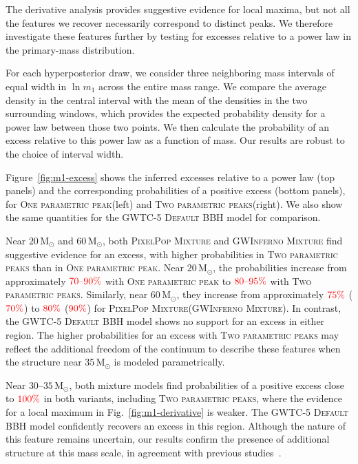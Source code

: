 \documentclass[twocolumn,twocolappendix,linenumbers]{aastex631}
\newcommand{\PPMixture}{\textsc{PixelPop Mixture}\xspace}
\newcommand{\GwinfMixture}{\textsc{GWInferno Mixture}\xspace}
\newcommand{\oneparpeak}{\textsc{One parametric peak}\xspace}
\newcommand{\twoparpeaks}{\textsc{Two parametric peaks}\xspace}
\newcommand{\Msun}{\ensuremath{\mathrm{M}_\odot}\xspace}
\begin{document}
The derivative analysis provides suggestive evidence for local maxima, but not all the features we recover necessarily correspond to distinct peaks.
We therefore investigate these features further by testing for excesses relative to a power law in the primary-mass distribution.

For each hyperposterior draw, we consider three neighboring mass intervals of equal width in $\ln m_1$ across the entire mass range. We compare the average density in the central interval with the mean of the densities in the two surrounding windows, which provides the expected probability density for a power law between those two points. We then calculate the probability of an excess relative to this power law as a function of mass. Our results are robust to the choice of interval width. 

Figure~\ref{fig:m1-excess} shows the inferred excesses relative to a power law (top panels) and the corresponding probabilities of a positive excess (bottom panels), for \oneparpeak (left) and \twoparpeaks (right). We also show the same quantities for the \ac{GWTC-5} \textsc{Default} \ac{BBH} model for comparison.

Near $20\,\Msun$ and $60\,\Msun$, both \PPMixture and \GwinfMixture find suggestive evidence for an excess, with higher probabilities in \twoparpeaks than in \oneparpeak. Near $20\,\Msun$, the probabilities increase from approximately $\textcolor{red}{70\text{--}90\%}$ with \oneparpeak to $\textcolor{red}{80\text{--}95\%}$ with \twoparpeaks. Similarly, near $60\,\Msun$, they increase from approximately $\textcolor{red}{75\%}$ ($\textcolor{red}{70\%}$) to $\textcolor{red}{80\%}$ ($\textcolor{red}{90\%}$) for \PPMixture (\GwinfMixture). In contrast, the \ac{GWTC-5} \textsc{Default} \ac{BBH} model shows no support for an excess in either region. The higher probabilities for an excess with \twoparpeaks may reflect the additional freedom of the continuum to describe these features when the structure near $35\,\Msun$ is modeled parametrically. 

Near $30$--$35\,\Msun$, both mixture models find probabilities of a positive excess close to $\textcolor{red}{100\%}$ in both variants, including \twoparpeaks, where the evidence for a local maximum in Fig.~\ref{fig:m1-derivative} is weaker. The \ac{GWTC-5} \textsc{Default} \ac{BBH} model confidently recovers an excess in this region. Although the nature of this feature remains uncertain, our results confirm the presence of additional structure at this mass scale, in agreement with previous studies~\citep[e.g.,][]{Talbot:2018cva, LIGOScientific:2018jsj, LIGOScientific:2020kqk, KAGRA:2021duu, Farah:2023vsc,Roy:2025ktr, Sridhar:2025kvi,LIGOScientific:2026ctl}.
\end{document}
